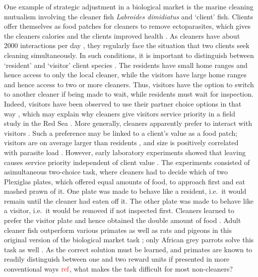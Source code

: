 \documentclass[]{rsos}%
\begin{document}
One example of strategic adjustment in a biological market is the marine
cleaning mutualism involving the cleaner fish \emph{Labroides dimidiatus} and
`client' fish. Clients offer themselves as food patches for cleaners to
remove ectoparasites, which gives the cleaners calories and the clients
improved health \citep{waldie_LongTerm_2011, ros_Does_2011, triki_Effects_2016}. As cleaners have about 2000
interactions per day \citep{grutter_Relationship_1995}, they regularly face
the situation that two clients seek cleaning simultaneously. In such
conditions, it is important to distinguish between `resident' and
`visitor' client species \citep{bshary_Cleaner_2001a}. The residents have
small home ranges and hence access to only the local cleaner, while the
visitors have large home ranges and hence access to two or more
cleaners. Thus, visitors have the option to switch to another cleaner if
being made to wait, while residents must wait for inspection. Indeed,
visitors have been observed to use their partner choice options in that
way \citep{bshary_Choosy_2002}, which may explain why cleaners give
visitors service priority in a field study in the Red Sea
\citep{bshary_Cleaner_2001a}. More generally, cleaners apparently prefer to
interact with visitors \citep{triki_Marine_2021}. Such a preference may be
linked to a client's value as a food patch; visitors are on average
larger than residents \citep{bshary_Cleaner_2001a}, and size is positively
correlated with parasite load \citep{grutter_Relationship_1995a}. However,
early laboratory experiments showed that leaving causes service
priority independent of client value \citep{bshary_Asymmetric_2002}.
The experiments consisted of asimultaneous two-choice task,
where cleaners had to decide which of two
Plexiglas plates, which offered equal amounts of food, to approach first
and eat mashed prawn of it. One plate was made to behave like a
resident, i.e.~it would remain until the cleaner had eaten off it. The
other plate was made to behave like a visitor, i.e.~it would be removed
if not inspected first. Cleaners learned to prefer the visitor plate and
hence obtained the double amount of food \citep{bshary_Asymmetric_2002}.
Adult cleaner fish outperform various primates as well as rats and
pigeons in this original version of the biological market task
\citep{salwiczek_Adult_2012, zentall_Early_2017}; only African grey
parrots solve this task as well \citep{pepperberg_Can_2014}. As the correct
solution must be learned, and primates are known to readily distinguish
between one and two reward units if presented in more conventional ways
\(\color{red}{\text{ref}}\), what makes the task difficult for most non-cleaners?
\end{document}
